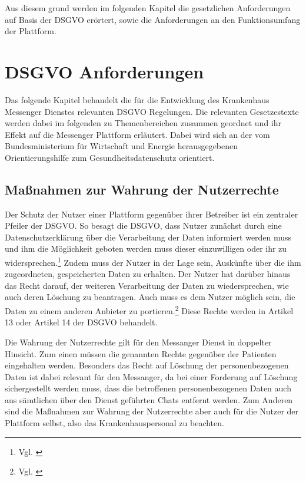 Aus diesem grund werden im folgenden Kapitel die gesetzlichen Anforderungen auf Basis der DSGVO erörtert, sowie die Anforderungen an den Funktionsumfang der Plattform. 

\section{DSGVO Anforderungen}\label{section:dsgvo}
Das folgende Kapitel behandelt die für die Entwicklung des Krankenhaus Messenger Dienstes relevanten DSGVO Regelungen. Die relevanten Gesetzestexte werden dabei im folgenden zu Themenbereichen zusammen geordnet und ihr Effekt auf die Messenger Plattform erläutert. Dabei wird sich an der vom Bundesministerium für Wirtschaft und Energie herausgegebenen Orientierungshilfe zum Gesundheitsdatenschutz orientiert.

\subsection{Maßnahmen zur Wahrung der Nutzerrechte}\label{subsection:mzwdn}
Der Schutz der Nutzer einer Plattform gegenüber ihrer Betreiber ist ein zentraler Pfeiler der DSGVO. So besagt die DSGVO, dass Nutzer zunächst durch eine Datenschutzerklärung über die Verarbeitung der Daten informiert werden muss und ihm die Möglichkeit geboten werden muss dieser einzuwilligen oder ihr zu widersprechen.\footnote{Vgl. \cite[S. 3]{OrientierungshilfezumGesundheitsdatenschutz2018}} Zudem muss der Nutzer in der Lage sein, Auskünfte über die ihm zugeordneten, gespeicherten Daten zu erhalten. Der Nutzer hat darüber hinaus das Recht darauf, der weiteren Verarbeitung der Daten zu wiedersprechen, wie auch deren Löschung zu beantragen. Auch muss es dem Nutzer möglich sein, die Daten zu einem anderen Anbieter zu portieren.\footnote{Vgl. \cite[S. 30 ff.]{OrientierungshilfezumGesundheitsdatenschutz2018}} Diese Rechte werden in Artikel 13 oder Artikel 14 der DSGVO behandelt.

Die Wahrung der Nutzerrechte gilt für den Messanger Dienst in doppelter Hinsicht.
Zum einen müssen die genannten Rechte gegenüber der Patienten eingehalten werden. Besonders das Recht auf Löschung der personenbezogenen Daten ist dabei relevant für den Messanger, da bei einer Forderung auf Löschung sichergestellt werden muss, dass die betroffenen personenbezogenen Daten auch aus sämtlichen über den Dienst geführten Chats entfernt werden. Zum Anderen sind die Maßnahmen zur Wahrung der Nutzerrechte aber auch für die Nutzer der Plattform selbst, also das Krankenhauspersonal zu beachten.

